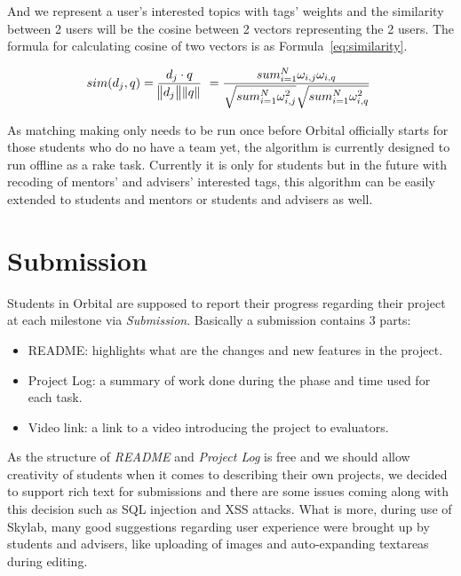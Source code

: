 \begin{itemize}
  And we represent a user's interested topics with tags' weights and the similarity between 2 users will be the cosine between 2 vectors representing the 2 users. The formula for calculating cosine of two vectors is as Formula~\ref{eq:similarity}\cite{citationvecspacemodel}.

  \begin{equation}
    sim(d_j, q)  = \frac{d_j \cdot q}{ \norm{d_j} \norm{q} } \ = \frac{sum_{i=1}^{N} \omega_{i,j} \omega_{i,q}}{ \sqrt{sum_{i=1}^{N} \omega_{i,j}^2} \sqrt{sum_{i=1}^{N} \omega_{i,q}^2}} \
    \label{eq:similarity}
  \end{equation}

\end{itemize}

As matching making only needs to be run once before Orbital officially starts for those students who do no have a team yet, the algorithm is currently designed to run offline as a rake task. Currently it is only for students but in the future with recoding of mentors' and advisers' interested tags, this algorithm can be easily extended to students and mentors or students and advisers as well.

\section{Submission} \label{submission}

Students in Orbital are supposed to report their progress regarding their project at each milestone via \textit{Submission}. Basically a submission contains 3 parts:

\begin{itemize}
  \item README: highlights what are the changes and new features in the project.
  \item Project Log: a summary of work done during the phase and time used for each task.
  \item Video link: a link to a video introducing the project to evaluators.
\end{itemize}

As the structure of \textit{README} and \textit{Project Log} is free and we should allow creativity of students when it comes to describing their own projects, we decided to support rich text for submissions and there are some issues coming along with this decision such as SQL injection and XSS attacks. What is more, during use of Skylab, many good suggestions regarding user experience were brought up by students and advisers, like uploading of images and auto-expanding textareas during editing.


